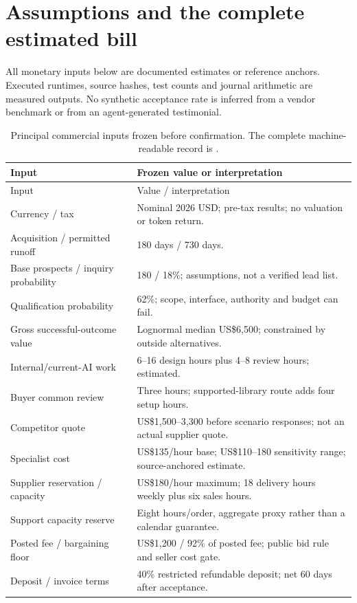 \section{Assumptions and the complete estimated bill}
All monetary inputs below are documented estimates or reference anchors. Executed runtimes, source hashes, test counts and journal arithmetic are measured outputs. No synthetic acceptance rate is inferred from a vendor benchmark or from an agent-generated testimonial.

\begin{longtable}{L{0.48\textwidth}L{0.43\textwidth}}
\caption{Principal commercial inputs frozen before confirmation. The complete machine-readable record is \protect{}.}\\
\toprule Input & Frozen value or interpretation\\
\midrule\endfirsthead
\toprule Input & Value / interpretation\\\midrule\endhead
Currency / tax & Nominal 2026 USD; pre-tax results; no valuation or token return.\\
Acquisition / permitted runoff & 180 days / 730 days.\\
Base prospects / inquiry probability & 180 / 18\%; assumptions, not a verified lead list.\\
Qualification probability & 62\%; scope, interface, authority and budget can fail.\\
Gross successful-outcome value & Lognormal median US\$6,500; constrained by outside alternatives.\\
Internal/current-AI work & 6--16 design hours plus 4--8 review hours; estimated.\\
Buyer common review & Three hours; supported-library route adds four setup hours.\\
Competitor quote & US\$1,500--3,300 before scenario responses; not an actual supplier quote.\\
Specialist cost & US\$135/hour base; US\$110--180 sensitivity range; source-anchored estimate.\\
Supplier reservation / capacity & US\$180/hour maximum; 18 delivery hours weekly plus six sales hours.\\
Support capacity reserve & Eight hours/order, aggregate proxy rather than a calendar guarantee.\\
Posted fee / bargaining floor & US\$1,200 / 92\% of posted fee; public bid rule and seller cost gate.\\
Deposit / invoice terms & 40\% restricted refundable deposit; net 60 days after acceptance.\\

\end{longtable}
